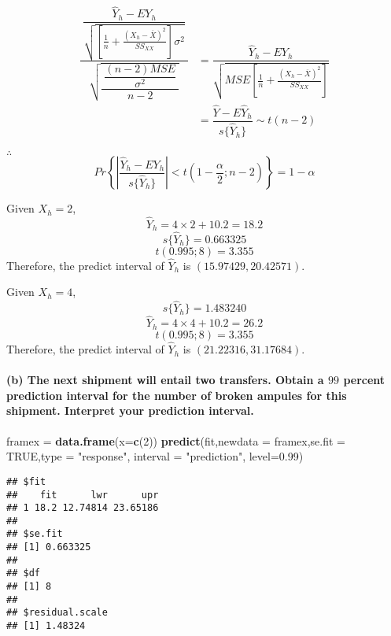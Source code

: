 \documentclass[]{article}
\newenvironment{Shaded}{\begin{snugshade}}{\end{snugshade}}
\newcommand{\KeywordTok}[1]{\textcolor[rgb]{0.13,0.29,0.53}{\textbf{#1}}}
\newcommand{\DataTypeTok}[1]{\textcolor[rgb]{0.13,0.29,0.53}{#1}}
\newcommand{\DecValTok}[1]{\textcolor[rgb]{0.00,0.00,0.81}{#1}}
\newcommand{\FloatTok}[1]{\textcolor[rgb]{0.00,0.00,0.81}{#1}}
\newcommand{\StringTok}[1]{\textcolor[rgb]{0.31,0.60,0.02}{#1}}
\newcommand{\OtherTok}[1]{\textcolor[rgb]{0.56,0.35,0.01}{#1}}
\newcommand{\NormalTok}[1]{#1}
\let\oldparagraph\paragraph
\renewcommand{\paragraph}[1]{\oldparagraph{#1}\mbox{}}
\begin{document}
\begin{align*}
\dfrac{\ \dfrac{\hat{Y}_h-EY_h}{\sqrt{\left[\frac{1}{n}+\frac{(X_h-\overline{X})^2}{SS_{XX}}\right]\sigma^2}}\ }{\sqrt{\dfrac{\ \dfrac{(n-2)MSE}{\sigma^2}\ }{n-2}}}&=\dfrac{\hat{Y}_h-EY_h}{\sqrt{MSE\left[\frac{1}{n}+\frac{(X_h-\overline{X})^2}{SS_{XX}}\right]}}\\
&=\dfrac{\hat{Y}-E\hat{Y}_h}{s\{\hat{Y}_h\}}\sim t(n-2)
\end{align*}

\(\therefore\quad\)
\[Pr\left\{\left|\dfrac{\hat{Y}_h-EY_h}{s\{\hat{Y}_h\}}\right|<t(1-\frac{\alpha}{2};n-2)\right\}=1-\alpha\]

Given \(X_h=2\),\[\hat{Y}_h=4\times 2+10.2=18.2\]
\[s\{\hat{Y}_h\}=0.663325\] \[t(0.995;8)=3.355\] Therefore, the predict
interval of \(\hat{Y}_h\) is \((15.97429,20.42571).\)

Given \(X_h=4\), \[s\{\hat{Y}_h\}=1.483240 \]
\[\hat{Y}_h=4\times 4+10.2=26.2\] \[t(0.995;8)=3.355\] Therefore, the
predict interval of \(\hat{Y}_h\) is \((21.22316,31.17684)\).

\paragraph{\texorpdfstring{(b) The next shipment will entail two
transfers. Obtain a \(99\) percent prediction interval for the number of
broken ampules for this shipment. Interpret your prediction
interval.}{(b) The next shipment will entail two transfers. Obtain a 99 percent prediction interval for the number of broken ampules for this shipment. Interpret your prediction interval.}}\label{b-the-next-shipment-will-entail-two-transfers.-obtain-a-99-percent-prediction-interval-for-the-number-of-broken-ampules-for-this-shipment.-interpret-your-prediction-interval.}

\begin{Shaded}
\begin{Highlighting}[]
\NormalTok{framex =}\StringTok{ }\KeywordTok{data.frame}\NormalTok{(}\DataTypeTok{x=}\KeywordTok{c}\NormalTok{(}\DecValTok{2}\NormalTok{))}
\KeywordTok{predict}\NormalTok{(fit,}\DataTypeTok{newdata =}\NormalTok{ framex,}\DataTypeTok{se.fit =} \OtherTok{TRUE}\NormalTok{,}\DataTypeTok{type =} \StringTok{"response"}\NormalTok{,}
\DataTypeTok{interval =} \StringTok{"prediction"}\NormalTok{, }\DataTypeTok{level=}\FloatTok{0.99}\NormalTok{)}
\end{Highlighting}
\end{Shaded}

\begin{verbatim}
## $fit
##    fit      lwr      upr
## 1 18.2 12.74814 23.65186
## 
## $se.fit
## [1] 0.663325
## 
## $df
## [1] 8
## 
## $residual.scale
## [1] 1.48324
\end{verbatim}
\end{document}
